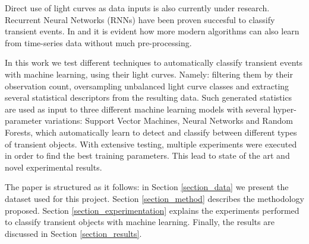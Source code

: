 Direct use of light curves as data inputs is also currently under research. Recurrent Neural Networks (RNNs) have been proven succesful to classify transient events. In \cite{1606.07442} and \cite{1710.06804} it is evident how more modern algorithms can also learn from time-series data without much pre-processing.

In this work we test different techniques to automatically classify transient events with machine learning, using their light curves. Namely: filtering them by their observation count, oversampling unbalanced light curve classes and extracting several statistical descriptors from the resulting data. Such generated statistics are used as input to three different machine learning models with several hyper-parameter variations: Support Vector Machines, Neural Networks and Random Forests, which automatically learn to detect and classify between different types of transient objects. With extensive testing, multiple experiments were executed in order to find the best training parameters. This lead to state of the art and novel experimental results.

The paper is structured as it follows: in Section \ref{section_data} we present the dataset used for this project. Section \ref{section_method} describes the methodology proposed. Section \ref{section_experimentation} explains the experiments performed to classify transient objects with machine learning. Finally, the results are discussed in Section \ref{section_results}.
